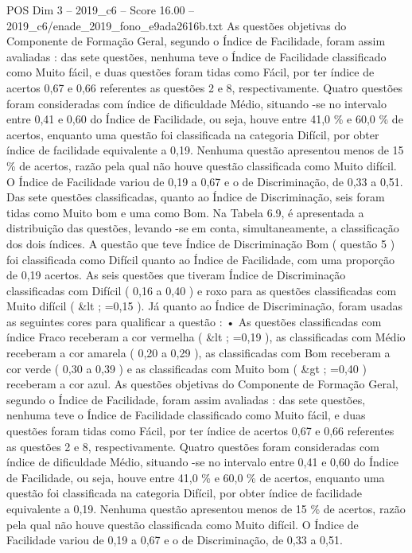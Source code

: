 \begin{textsample}{POS Dim 3 – 2019\_c6 – Score 16.00 – 2019\_c6/enade\_2019\_fono\_e9ada2616b.txt}
As questões objetivas do Componente de Formação Geral, segundo o Índice de Facilidade, foram assim avaliadas : das sete questões, nenhuma teve o Índice de Facilidade classificado como Muito fácil, e duas questões foram tidas como Fácil, por ter índice de acertos 0,67 e 0,66 referentes as questões 2 e 8, respectivamente.
Quatro questões foram consideradas com índice de dificuldade Médio, situando -se no intervalo entre 0,41 e 0,60 do Índice de Facilidade, ou seja, houve entre 41,0 \% e 60,0 \% de acertos, enquanto uma questão foi classificada na categoria Difícil, por obter índice de facilidade equivalente a 0,19.
Nenhuma questão apresentou menos de 15 \% de acertos, razão pela qual não houve questão classificada como Muito difícil.
O Índice de Facilidade variou de 0,19 a 0,67 e o de Discriminação, de 0,33 a 0,51.
Das sete questões classificadas, quanto ao Índice de Discriminação, seis foram tidas como Muito bom e uma como Bom.
Na Tabela 6.9, é apresentada a distribuição das questões, levando -se em conta, simultaneamente, a classificação dos dois índices.
A questão que teve Índice de Discriminação Bom ( questão 5 ) foi classificada como Difícil quanto ao Índice de Facilidade, com uma proporção de 0,19 acertos.
As seis questões que tiveram Índice de Discriminação classificadas com Difícil ( 0,16 a 0,40 ) e roxo para as questões classificadas com Muito difícil ( \&lt ; =0,15 ).
Já quanto ao Índice de Discriminação, foram usadas as seguintes cores para qualificar a questão : • As questões classificadas com índice Fraco receberam a cor vermelha ( \&lt ; =0,19 ), as classificadas com Médio receberam a cor amarela ( 0,20 a 0,29 ), as classificadas com Bom receberam a cor verde ( 0,30 a 0,39 ) e as classificadas com Muito bom ( \&gt ; =0,40 ) receberam a cor azul.
As questões objetivas do Componente de Formação Geral, segundo o Índice de Facilidade, foram assim avaliadas : das sete questões, nenhuma teve o Índice de Facilidade classificado como Muito fácil, e duas questões foram tidas como Fácil, por ter índice de acertos 0,67 e 0,66 referentes as questões 2 e 8, respectivamente.
Quatro questões foram consideradas com índice de dificuldade Médio, situando -se no intervalo entre 0,41 e 0,60 do Índice de Facilidade, ou seja, houve entre 41,0 \% e 60,0 \% de acertos, enquanto uma questão foi classificada na categoria Difícil, por obter índice de facilidade equivalente a 0,19.
Nenhuma questão apresentou menos de 15 \% de acertos, razão pela qual não houve questão classificada como Muito difícil.
O Índice de Facilidade variou de 0,19 a 0,67 e o de Discriminação, de 0,33 a 0,51.

\end{textsample}
